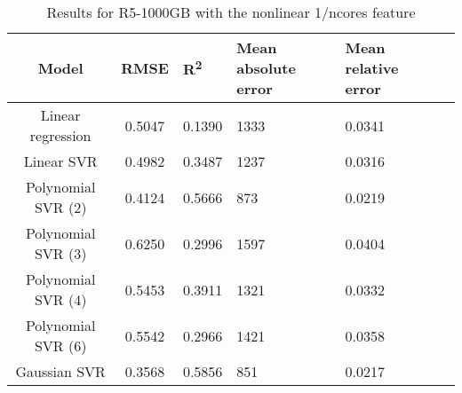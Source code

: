 \begin{table}[H]
\centering
\begin{adjustbox}{center}
\begin{tabular}{c | c M{1.2cm} M{2.5cm} M{2.5cm} M{1.8cm}}
Model & RMSE & R\textsuperscript{2} & Mean absolute error & Mean relative error \tabularnewline
\hline
Linear regression & 0.5047 & 0.1390 &   1333 & 0.0341 \\
Linear SVR & 0.4982 & 0.3487 &   1237 & 0.0316 \\
Polynomial SVR (2) & 0.4124 & 0.5666 &    873 & 0.0219 \\
Polynomial SVR (3) & 0.6250 & 0.2996 &   1597 & 0.0404 \\
Polynomial SVR (4) & 0.5453 & 0.3911 &   1321 & 0.0332 \\
Polynomial SVR (6) & 0.5542 & 0.2966 &   1421 & 0.0358 \\
Gaussian SVR & 0.3568 & 0.5856 &    851 & 0.0217 \\
\end{tabular}
\end{adjustbox}
\\
\caption{Results for R5-1000GB with the nonlinear 1/ncores feature}
\label{tab:all_nonlinear_R5_1000}
\end{table}
